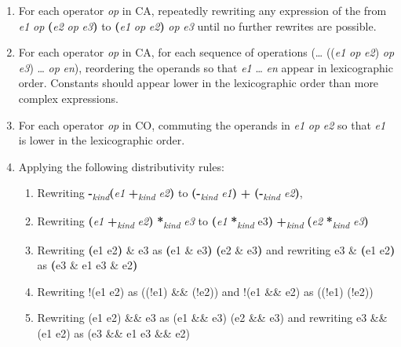 \documentclass[]{article}
\begin{document}
\begin{enumerate}
\def\labelenumi{\alph{enumi}.}
\item
  For each operator \emph{op} in CA, repeatedly rewriting any expression
  of the from \emph{e1} \emph{op} \textbf{(}\emph{e2} \emph{op}
  \emph{e3}\textbf{)} to \textbf{(}\emph{e1} \emph{op}
  \emph{e2}\textbf{)} \emph{op} \emph{e3} until no further rewrites are
  possible.
\item
  For each operator \emph{op} in CA, for each sequence of operations
  (\ldots{} ((\emph{e1} \emph{op} \emph{e2}) \emph{op} \emph{e3})
  \ldots{} \emph{op} \emph{en}), reordering the operands so that
  \emph{e1} \ldots{} \emph{en} appear in lexicographic order. Constants
  should appear lower in the lexicographic order than more complex
  expressions.
\item
  For each operator \emph{op} in CO, commuting the operands in \emph{e1}
  \emph{op} \emph{e2} so that \emph{e1} is lower in the lexicographic
  order.
\item
  Applying the following distributivity rules:

  \begin{enumerate}
  \def\labelenumii{\roman{enumii}.}
  \item
    Rewriting \textbf{-}\emph{\textsubscript{kind}}\textbf{(}\emph{e1}
    \textbf{+}\emph{\textsubscript{kind}} \emph{e2}\textbf{)} to
    \textbf{(-}\emph{\textsubscript{kind} e1}\textbf{)} \textbf{+}
    \textbf{(-}\emph{\textsubscript{kind} e2}\textbf{)},
  \item
    Rewriting \textbf{(}\emph{e1} \textbf{+}\emph{\textsubscript{kind}}
    \emph{e2}\textbf{)} \textbf{*}\emph{\textsubscript{kind}} \emph{e3}
    to \textbf{(}\emph{e1} \textbf{*}\emph{\textsubscript{kind}}
    e3\textbf{)} \textbf{+}\emph{\textsubscript{kind}}
    \textbf{(}\emph{e2} \textbf{*}\emph{\textsubscript{kind}}
    \emph{e3}\textbf{)}
  \item
    Rewriting \textbf{(}e1 \textbar{} e2\textbf{)} \& e3 as \textbf{(}e1
    \& e3\textbf{)} \textbar{} \textbf{(}e2 \& e3\textbf{)} and
    rewriting e3 \& \textbf{(}e1 \textbar{} e2\textbf{)} as \textbf{(}e3
    \& e1 \textbar{} e3 \& e2\textbf{)}
  \item
    Rewriting !(e1 \textbar{}\textbar{} e2) as ((!e1) \&\& (!e2)) and
    !(e1 \&\& e2) as ((!e1) \textbar{}\textbar{} (!e2))
  \item
    Rewriting (e1 \textbar{}\textbar{} e2) \&\& e3 as (e1 \&\& e3)
    \textbar{}\textbar{} (e2 \&\& e3) and rewriting e3 \&\& (e1
    \textbar{}\textbar{} e2) as (e3 \&\& e1 \textbar{}\textbar{} e3 \&\&
    e2)
  \end{enumerate}
\end{enumerate}
\end{document}
